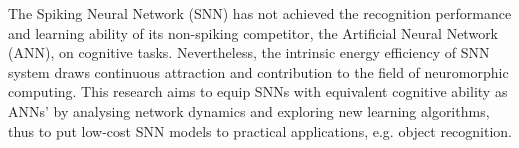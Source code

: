 % 
%
%

The Spiking Neural Network (SNN) has not achieved the recognition performance and learning ability of its non-spiking competitor, the Artificial Neural Network (ANN), on cognitive tasks.
Nevertheless, the intrinsic energy efficiency of SNN system draws continuous attraction and contribution to the field of neuromorphic computing.
This research aims to equip SNNs with equivalent cognitive ability as ANNs' by analysing network dynamics and exploring new learning algorithms, thus to put low-cost SNN models to practical applications, e.g. object recognition.

